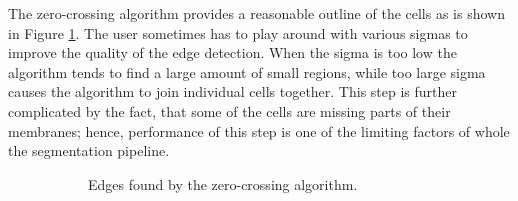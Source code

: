 \documentclass[
  digital,     %
  oneside,     %
  nosansbold,  %
  nocolorbold, %
  lof,         %
  lot,         %
]{fithesis4}
\begin{document}
The zero-crossing algorithm provides a reasonable outline of the cells as is
shown in Figure \ref{fig:zc}. The user sometimes has to play around with
various sigmas to improve the quality of the edge detection. When the sigma is
too low the algorithm tends to find a large amount of small regions, while too
large sigma causes the algorithm to join individual cells together. This step
is further complicated by the fact, that some of the cells are missing parts of
their membranes; hence, performance of this step is one of the limiting factors of
whole the segmentation pipeline. %

\begin{figure}
    \begin{subfigure}[t]{0.45\textwidth}
        \caption{Edges found by the zero-crossing algorithm.}
        \label{fig:zc}
    \end{subfigure}
    \begin{subfigure}[t]{0.45\textwidth}

\end{subfigure}
\end{figure}
\end{document}

